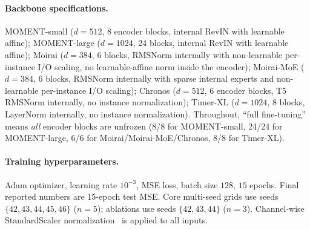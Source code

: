 \documentclass{article}
\begin{document}
\paragraph{Backbone specifications.} MOMENT-small ($d{=}512$, 8 encoder blocks, internal RevIN with learnable affine); MOMENT-large ($d{=}1024$, 24 blocks, internal RevIN with learnable affine); Moirai ($d{=}384$, 6 blocks, RMSNorm internally with non-learnable per-instance I/O scaling, no learnable-affine norm inside the encoder); Moirai-MoE ($d{=}384$, 6 blocks, RMSNorm internally with sparse internal experts and non-learnable per-instance I/O scaling); Chronos ($d{=}512$, 6 encoder blocks, T5 RMSNorm internally, no instance normalization); Timer-XL ($d{=}1024$, 8 blocks, LayerNorm internally, no instance normalization). Throughout, ``full fine-tuning'' means \emph{all} encoder blocks are unfrozen (8/8 for MOMENT-small, 24/24 for MOMENT-large, 6/6 for Moirai/Moirai-MoE/Chronos, 8/8 for Timer-XL).

\paragraph{Training hyperparameters.} Adam optimizer, learning rate $10^{-3}$, MSE loss, batch size $128$, $15$ epochs. Final reported numbers are 15-epoch test MSE. Core multi-seed grids use seeds $\{42, 43, 44, 45, 46\}$ ($n{=}5$); ablations use seeds $\{42, 43, 44\}$ ($n{=}3$). Channel-wise StandardScaler normalization~\citep{zhou2021informer, nie2023patchtst} is applied to all inputs.
\end{document}
